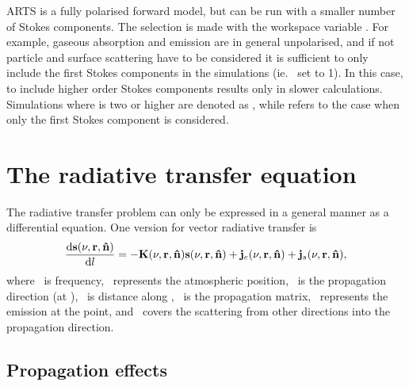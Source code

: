 ARTS is a fully polarised forward model, but can be run with a smaller number
of Stokes components. The selection is made with the workspace variable
. For example, gaseous absorption and emission are in
general unpolarised, and if not particle and surface scattering have to be
considered it is sufficient to only include the first Stokes components in the
simulations (ie.\  set to 1). In this case, to include
higher order Stokes components results only in slower calculations. Simulations
where  is two or higher are denoted as
, while  refers to the case when only the first Stokes component is
considered.
 



\section{The radiative transfer equation}
\label{sec:rteq}

The radiative transfer problem can only be expressed in a general manner as a
differential equation. One version for vector radiative transfer is
\begin{equation}
  \label{eq:VRTE0}
  \frac {\mathrm{d}{\bf s}(\nu,{\bf r},{\bf \hat{n}})}{\mathrm{d} l} =
    -{\bf K}(\nu,{\bf r},{\bf \hat{n}}) {\bf s}(\nu,{\bf r},{\bf \hat{n}}) +
    {\bf j}_{e}(\nu,{\bf r},{\bf \hat{n}}) + {\bf j}_{s}(\nu,{\bf r},{\bf \hat{n}}),  
\end{equation}
where \Frq\ is frequency, \PPos\ represents the atmospheric position, \PDir\ is
the propagation direction (at \PPos), \PpathLng\ is distance along \PDir,
\ExtMat\ is the propagation matrix, \ represents the emission at
the point, and \ covers the scattering from other directions into
the propagation direction.



\subsection{Propagation effects}
\label{sec:rteq:propmat}

